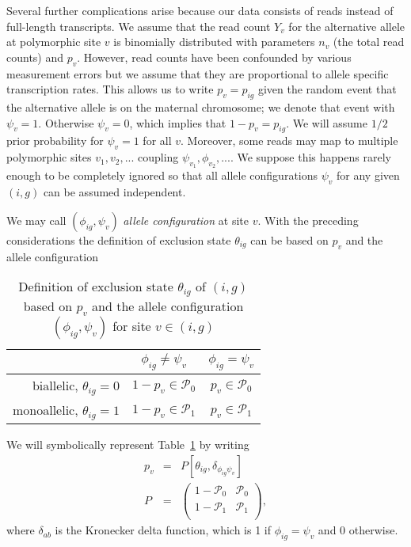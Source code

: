\documentclass[letterpaper]{article}
\begin{document}
Several further complications arise because our data consists of reads instead
of full-length transcripts.  We assume that the read count \(Y_v\) for the
alternative allele at polymorphic site \(v\) is binomially distributed with
parameters \(n_v\) (the total read counts) and \(p_{v}\).  However, read
counts have been confounded by various measurement errors but we assume that
they are proportional to allele specific transcription rates.  This allows us
to write \(p_v = p_{ig}\) given the random event that the alternative allele is on
the maternal chromosome; we denote that event with \(\psi_v=1\).
Otherwise \(\psi_v=0\), which implies that \(1-p_v=p_{ig}\).  We will assume
\(1/2\) prior probability for \(\psi_v=1\) for all \(v\).  Moreover, some
reads may map to multiple polymorphic sites \(v_1,v_2,...\) coupling
\(\psi_{v_1},\phi_{v_2},...\).  We suppose this happens rarely enough to be
completely ignored so that all allele configurations \(\psi_v\) for any given
\((i,g)\) can be assumed independent.

We may call \((\phi_{ig},\psi_v)\) \emph{allele
configuration} at site \(v\).  
With the preceding considerations the definition of exclusion state
\(\theta_{ig}\) can be
based on \(p_v\) and the allele configuration
\begin{table}[h]
\begin{center}
\begin{tabular}{r|cc|}
& \(\phi_{ig}\neq\psi_v\) & \(\phi_{ig}=\psi_v\) \\
\hline
biallelic, \(\theta_{ig}=0\) & \(1-p_v \in \mathcal{P}_0\) & \(p_v \in \mathcal{P}_0\) \\
monoallelic, \(\theta_{ig}=1\) & \(1-p_v \in \mathcal{P}_1\) & \(p_v \in \mathcal{P}_1\) \\
\hline
\end{tabular}
\caption{
Definition of exclusion state \(\theta_{ig}\) of \((i,g)\) based on
\(p_v\) and the allele configuration \((\phi_{ig},\psi_v)\) for
site \(v\in(i,g)\)
}
\label{tab:def-exclusion-state}
\end{center}
\end{table}

We will symbolically represent Table~\ref{tab:def-exclusion-state} by writing
\begin{eqnarray}
\label{eq:p-v-by-P-matrix}
p_v &=& P[\theta_{ig},\delta_{\phi_{ig}\psi_v}] \\
\label{eq:P-matrix}
P &=&
\begin{pmatrix}
1-\mathcal{P}_0 & \mathcal{P}_0 \\
1-\mathcal{P}_1 & \mathcal{P}_1 \\
\end{pmatrix},
\end{eqnarray}
where \(\delta_{ab}\) is
the Kronecker delta function, which is 1 if \(\phi_{ig}=\psi_v\) and 0
otherwise.
\end{document}
